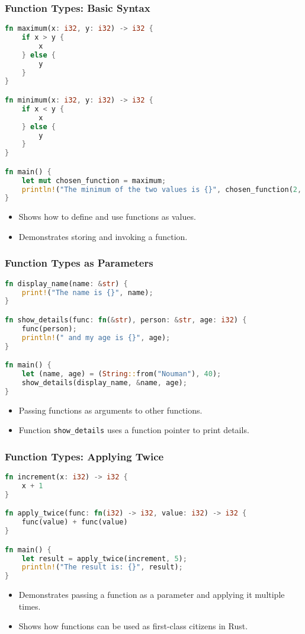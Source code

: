 \documentclass[aspectratio=169, table]{beamer}
\begin{document}
\begin{frame}[fragile]
\frametitle{Function Types: Basic Syntax}
\begin{lstlisting}[language=Rust]
fn maximum(x: i32, y: i32) -> i32 {
	if x > y {
		x
	} else {
		y
	}
}

fn minimum(x: i32, y: i32) -> i32 {
	if x < y {
		x
	} else {
		y
	}
}

fn main() {
	let mut chosen_function = maximum;
	println!("The minimum of the two values is {}", chosen_function(2, 3));
}
\end{lstlisting}
\begin{itemize}
\item Shows how to define and use functions as values.
\item Demonstrates storing and invoking a function.
\end{itemize}
\end{frame}

\begin{frame}[fragile]
\frametitle{Function Types as Parameters}
\begin{lstlisting}[language=Rust]
fn display_name(name: &str) {
	print!("The name is {}", name); 
}

fn show_details(func: fn(&str), person: &str, age: i32) {
	func(person); 
	println!(" and my age is {}", age);
}

fn main() {
	let (name, age) = (String::from("Nouman"), 40); 
	show_details(display_name, &name, age);
}
\end{lstlisting}
\begin{itemize}
\item Passing functions as arguments to other functions.
\item Function \texttt{show\_details} uses a function pointer to print details.
\end{itemize}
\end{frame}

\begin{frame}[fragile]
\frametitle{Function Types: Applying Twice}
\begin{lstlisting}[language=Rust]
fn increment(x: i32) -> i32 {
	x + 1
}

fn apply_twice(func: fn(i32) -> i32, value: i32) -> i32 {
	func(value) + func(value)
}

fn main() {
	let result = apply_twice(increment, 5);
	println!("The result is: {}", result);
}
\end{lstlisting}
\begin{itemize}
\item Demonstrates passing a function as a parameter and applying it multiple times.
\item Shows how functions can be used as first-class citizens in Rust.
\end{itemize}
\end{frame}
\end{document}
